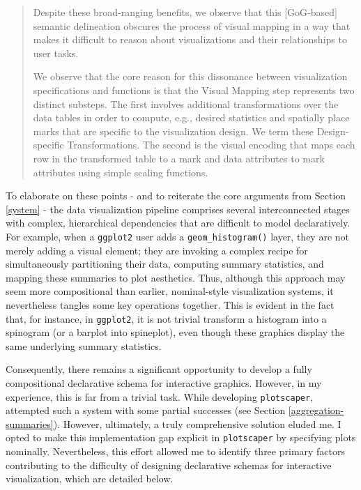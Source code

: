 \documentclass[
  openany]{book}
\theoremstyle{definition}
\theoremstyle{definition}
\theoremstyle{definition}
\theoremstyle{definition}
\theoremstyle{remark}
\begin{document}
\begin{quote}
Despite these broad-ranging benefits, we observe that this {[}GoG-based{]} semantic delineation obscures the process of visual mapping in a way that makes it difficult to reason about visualizations and their relationships to user tasks.

We observe that the core reason for this dissonance between visualization specifications and functions is that the Visual Mapping step represents two distinct substeps. The first involves additional transformations over the data tables in order to compute, e.g., desired statistics and spatially place marks that are specific to the visualization design. We term these Design-specific Transformations. The second is the visual encoding that maps each row in the transformed table to a mark and data attributes to mark attributes using simple scaling functions.
\end{quote}

To elaborate on these points - and to reiterate the core arguments from Section \ref{system} - the data visualization pipeline comprises several interconnected stages with complex, hierarchical dependencies that are difficult to model declaratively. For example, when a \texttt{ggplot2} user adds a \texttt{geom\_histogram()} layer, they are not merely adding a visual element; they are invoking a complex recipe for simultaneously partitioning their data, computing summary statistics, and mapping these summaries to plot aesthetics. Thus, although this approach may seem more compositional than earlier, nominal-style visualization systems, it nevertheless tangles some key operations together. This is evident in the fact that, for instance, in \texttt{ggplot2}, it is not trivial transform a histogram into a spinogram (or a barplot into spineplot), even though these graphics display the same underlying summary statistics.

Consequently, there remains a significant opportunity to develop a fully compositional declarative schema for interactive graphics. However, in my experience, this is far from a trivial task. While developing \texttt{plotscaper}, attempted such a system with some partial successes (see Section \ref{aggregation-summaries}). However, ultimately, a truly comprehensive solution eluded me. I opted to make this implementation gap explicit in \texttt{plotscaper} by specifying plots nominally. Nevertheless, this effort allowed me to identify three primary factors contributing to the difficulty of designing declarative schemas for interactive visualization, which are detailed below.
\end{document}
